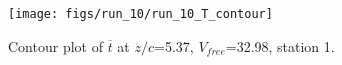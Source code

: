 \begin{figure}[H]
\centering
\texttt{[image: figs/run\_10/run\_10\_T\_contour]}
\caption{Contour plot of $\overline{t}$ at $z/c$=5.37, $V_{free}$=32.98, station 1.}
\label{fig:run_10_T_contour}
\end{figure}


